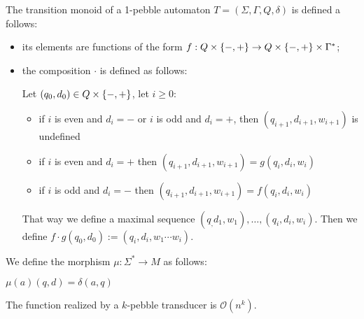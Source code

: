 \begin{definition}
The transition monoid of a 1-pebble automaton $T=(\Sigma,\Gamma,Q, \delta)$ is defined a follows:
\begin{itemize}
\item its elements are functions of the form $f:Q\times\{{-},{+}\}\to Q\times\{{-},{+}\}\times \Gamma^*$;
\item the composition $\cdot$ is defined as follows:

Let $(q_0,d_0)\in Q\times \{{-},{+}\}$, let $i\geq 0$:
\begin{itemize}
\item if $i$ is even and $d_i={-}$ or $i$ is odd and $d_i={+}$, then $(q_{i+1},d_{i+1},w_{i+1})$ is undefined
\item if $i$ is even and $d_i={+}$ then $(q_{i+1},d_{i+1},w_{i+1})=g(q_i,d_i,w_i)$
\item if $i$ is odd and $d_i={-}$ then $(q_{i+1},d_{i+1},w_{i+1})=f(q_i,d_i,w_i)$
\end{itemize}
That way we define a maximal sequence $(q_,d_1,w_1),\ldots,(q_i,d_i,w_i)$.
Then we define $f\cdot g(q_0,d_0):=(q_i,d_i,w_1\cdots w_i)$.

\end{itemize}

We define the morphism $\mu:\Sigma^*\to M$ as follows:

$\mu(a)(q,d)=\delta(a,q)$
\end{definition}


\begin{proposition}[\cite{}]
The function realized by a $k$-pebble transducer is $\mathcal{O}(n^k)$.
\end{proposition}